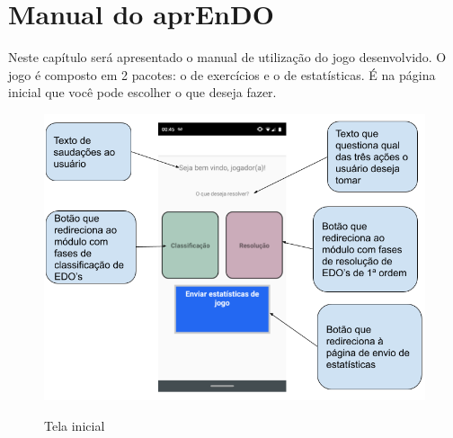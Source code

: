 \chapter[Manual do aprEnDO]{Manual do aprEnDO}
Neste capítulo será apresentado o manual de utilização do jogo desenvolvido. O jogo é composto em 2 pacotes: o de exercícios e o de estatísticas. É na página inicial que você pode escolher o que deseja fazer.

\begin{figure}[H]
\centering
\caption{Tela inicial}
\includegraphics[scale=0.52]{figuras/tela_inicial.png}
\label{tela_inicial}
\end{figure}



